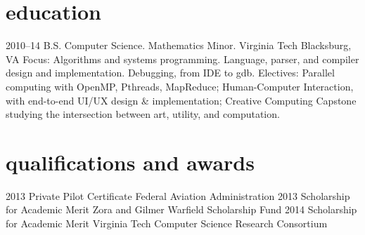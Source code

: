 \documentclass[]{cv-style}          %
\begin{document}

\section{education}

\begin{entrylist}
\entry
{2010--14}
{B.S. Computer Science. Mathematics Minor. {\normalfont Virginia Tech}}
{Blacksburg, VA}
{Focus: Algorithms and systems programming. Language, parser, and compiler design and implementation. Debugging, from IDE to gdb. Electives: Parallel computing with OpenMP, Pthreads, MapReduce; Human-Computer Interaction, with end-to-end UI/UX design \& implementation; Creative Computing Capstone studying the intersection between art, utility, and computation.}
\end{entrylist}


\section{qualifications and awards}
\begin{entrylist}
\entry
{2013}
{Private Pilot Certificate}
{Federal Aviation Administration}
{\vspace{-1.0cm}}
\entry
{2013}
{Scholarship for Academic Merit}
{Zora and Gilmer Warfield Scholarship Fund}
{\vspace{-1.0cm}}
\entry
{2014}
{Scholarship for Academic Merit}
{Virginia Tech Computer Science Research Consortium}
{\vspace{-1.0cm}}
\end{entrylist}

\end{document}
